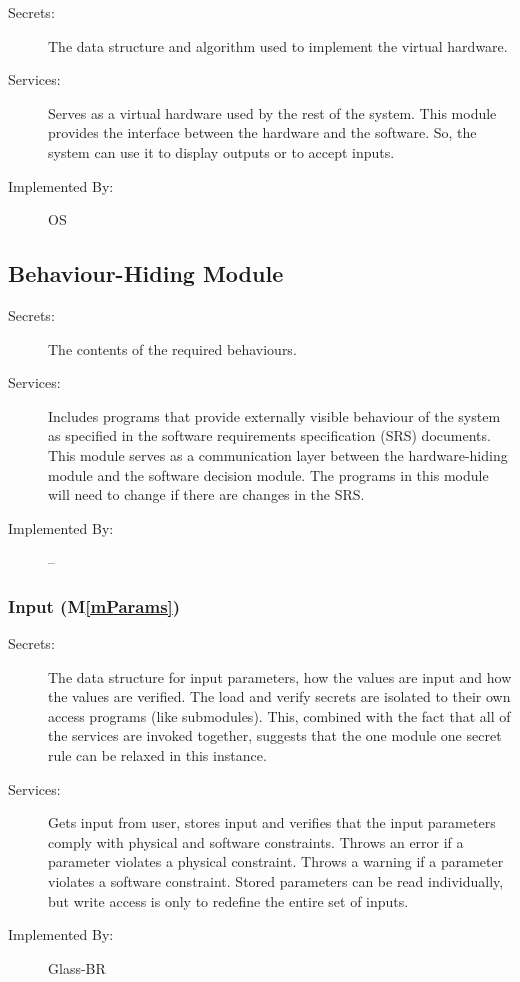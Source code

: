 \documentclass[12pt]{article}
\newcommand{\mref}[1]{M\ref{#1}}
\begin{document}
\begin{description}
\item[Secrets:]The data structure and algorithm used to implement the virtual
  hardware.
\item[Services:]Serves as a virtual hardware used by the rest of the
  system. This module provides the interface between the hardware and the
  software. So, the system can use it to display outputs or to accept inputs.
\item[Implemented By:] OS
\end{description}

\subsection{Behaviour-Hiding Module}

\begin{description}
\item[Secrets:]The contents of the required behaviours.
\item[Services:]Includes programs that provide externally visible behaviour of
  the system as specified in the software requirements specification (SRS)
  documents. This module serves as a communication layer between the
  hardware-hiding module and the software decision module. The programs in this
  module will need to change if there are changes in the SRS.
\item[Implemented By:] --
\end{description}

\subsubsection{Input (\mref{mParams})}

\begin{description}
\item[Secrets:] The data structure for input parameters, how the
values are input and how the values are verified.  The load and verify secrets
are isolated to their own access programs (like submodules).  This, combined
with the fact that all of the services are invoked together, suggests that the
one module one secret rule can be relaxed in this instance.
\item[Services:] Gets input from user, stores input and verifies that the
  input parameters comply with physical and software constraints. Throws an
  error if a parameter violates a physical constraint. Throws a warning if a
  parameter violates a software constraint.  Stored parameters can be read
  individually, but write access is only to redefine the entire set of inputs.
\item[Implemented By:] Glass-BR
\end{description}
\end{document}
